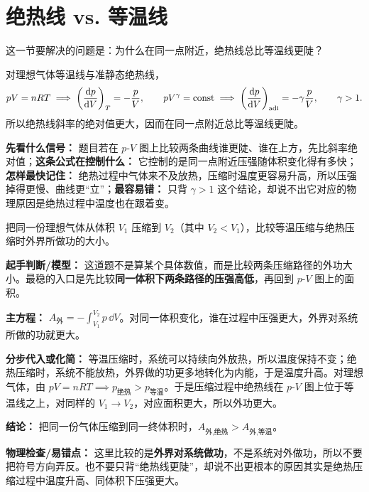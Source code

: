 \documentclass[lang=cn,11pt]{elegantbook}
\begin{document}
\section{绝热线 vs. 等温线}

这一节要解决的问题是：为什么在同一点附近，绝热线总比等温线更陡？

对理想气体等温线与准静态绝热线，
\[
pV=nRT
\implies \left(\dv{p}{V}\right)_T=-\frac{p}{V},
\qquad
pV^\gamma=\text{const}
\implies \left(\dv{p}{V}\right)_{\text{adi}}=-\gamma\frac{p}{V},
\qquad
\gamma>1.
\]
所以绝热线斜率的绝对值更大，因而在同一点附近总比等温线更陡。

\begin{note}
\textbf{先看什么信号：} 题目若在 \(p\)-\(V\) 图上比较两条曲线谁更陡、谁在上方，先比斜率绝对值；\textbf{这条公式在控制什么：} 它控制的是同一点附近压强随体积变化得有多快；\textbf{怎样最快记住：} 绝热过程中气体来不及放热，压缩时温度更容易升高，所以压强掉得更慢、曲线更“立”；\textbf{最容易错：} 只背 \(\gamma>1\) 这个结论，却说不出它对应的物理原因是绝热过程中温度也在跟着变。
\end{note}

\begin{example}[等温压缩与绝热压缩的比较]
把同一份理想气体从体积 \(V_1\) 压缩到 \(V_2\)（其中 \(V_2<V_1\)），比较等温压缩与绝热压缩时外界所做功的大小。
\end{example}

\begin{solution}
\textbf{起手判断/模型：} 这道题不是算某个具体数值，而是比较两条压缩路径的外功大小。最稳的入口是先比较\textbf{同一体积下两条路径的压强高低}，再回到 \(p\)-\(V\) 图上的面积。

\textbf{主方程：} \(A_{\text{外}}=-\int_{V_1}^{V_2}p\,\dd V\)。对同一体积变化，谁在过程中压强更大，外界对系统所做的功就更大。

\textbf{分步代入或化简：} 等温压缩时，系统可以持续向外放热，所以温度保持不变；绝热压缩时，系统不能放热，外界做的功更多地转化为内能，于是温度升高。对理想气体，由 \(pV=nRT\implies p_{\text{绝热}}>p_{\text{等温}}\)。于是压缩过程中绝热线在 \(p\)-\(V\) 图上位于等温线之上，对同样的 \(V_1\to V_2\)，对应面积更大，所以外功更大。

\textbf{结论：} 把同一份气体压缩到同一终体积时，\(A_{\text{外,绝热}}>A_{\text{外,等温}}\)。

\textbf{物理检查/易错点：} 这里比较的是\textbf{外界对系统做功}，不是系统对外做功，所以不要把符号方向弄反。也不要只背“绝热线更陡”，却说不出更根本的原因其实是绝热压缩过程中温度升高、同体积下压强更大。
\end{solution}
\end{document}
